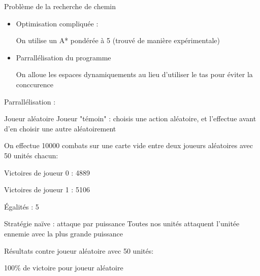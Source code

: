 \documentclass[french]{beamer}
\begin{document}
\begin{frame}{Problème de la recherche de chemin}
	\begin{itemize}
		\item Optimisation compliquée :
		
		On utilise un A* pondérée à 5 (trouvé de manière expérimentale)
		
		\item Parrallélisation du programme
		
		On alloue les espaces dynamiquements au lieu d'utiliser le tas pour éviter la conccurence
	\end{itemize}
Parrallélisation :
\begin{center}
\end{center}

\end{frame}
\begin{frame}{Joueur aléatoire}
	Joueur "témoin" : choisis une action aléatoire, et l'effectue avant d'en choisir une autre aléatoirement
	\vspace*{1em}
	
	On effectue 10000 combats sur une carte vide entre deux joueurs aléatoires avec 50 unités chacun:
	\vspace*{1em}
	
	Victoires de joueur 0 : 4889
	
	Victoires de joueur 1 : 5106
	
	Égalités : 5
\end{frame}
\begin{frame}{Stratégie naïve : attaque par puissance}
	Toutes nos unités attaquent l'unitée ennemie avec la plus grande puissance
	\vspace*{1em}
	
	Résultats contre joueur aléatoire avec 50 unités:
	\vspace*{1em}
	
	100\% de victoire pour joueur aléatoire
\end{frame}
\end{document}
